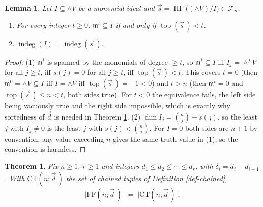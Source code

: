 \documentclass[11pt, a4paper, abstract=yes]{scrartcl}
\theoremstyle{definition}
\theoremstyle{remark}
\theoremstyle{plain}
\newtheorem{lemma}[definition]{Lemma}
\newtheorem{theorem}[definition]{Theorem}
\newcommand{\indeg}{\operatorname{indeg}}
\newcommand{\tp}{\operatorname{top}}
\newcommand{\HF}{\operatorname{HF}}
\newcommand{\Ext}{\mathord{\wedge }V}
\begin{document}
\begin{lemma}
Let \(I\subseteq \Ext\) be a monomial ideal and \(\vec s=\HF\bigl((\Ext)/I\bigr)\in\mathcal F_n\).
\begin{enumerate}
\item For every integer \(t\ge0\): \(\mathfrak m^t\subseteq I\) if and only if \(\tp(\vec s\,)<t\).
\item \(\indeg(I)=\indeg(\vec s\,)\).
\end{enumerate}
\label{lem-dictionary}
\end{lemma}

\begin{proof}
(1) \(\mathfrak m^t\) is spanned by the monomials of degree \(\ge t\), so
\(\mathfrak m^t\subseteq I\) iff \(I_j=\wedge^jV\) for all \(j\ge t\), iff \(s(j)=0\) for all \(j\ge t\),
iff \(\tp(\vec s\,)<t\). This covers \(t=0\) (then \(\mathfrak m^0=\Ext\subseteq I\) iff \(I=\Ext\) iff
\(\tp(\vec s\,)=-1<0\)) and \(t>n\) (then \(\mathfrak m^t=0\) and \(\tp(\vec s\,)\le n<t\), both sides true). For
\(t<0\) the equivalence fails, the left side being vacuously true and the right side impossible,
which is exactly why sortedness of \(\vec d\) is needed in Theorem \ref{thm-chaining}.
(2) \(\dim I_j=\binom nj-s(j)\), so the least \(j\) with \(I_j\ne0\) is the least \(j\) with
\(s(j)<\binom nj\). For \(I=0\) both sides are \(n+1\) by convention; any value exceeding \(n\) gives
the same truth value in (1), so the convention is harmless.
\end{proof}

\begin{theorem}
Fix \(n\ge1\), \(r\ge1\) and integers \(d_1\le d_2\le\cdots\le d_r\), with
\(\delta_i=d_i-d_{i-1}\). With \(\mathrm{CT}(n;\vec d\,)\) the set of chained tuples of
Definition \ref{def-chained},
\begin{equation}\label{eq:auto-14}
  \lvert\mathrm{FF}(n;\vec d\,)\rvert\;=\;\lvert\mathrm{CT}(n;\vec d\,)\rvert ,
\end{equation}
\label{thm-chaining}
\end{theorem}
\end{document}
